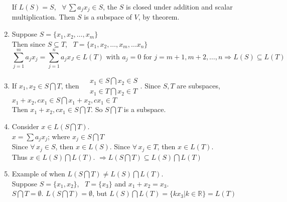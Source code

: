 \documentclass[twoside]{amsart}
\theoremstyle{plain}
\theoremstyle{definition}
\begin{document}
\begin{enumerate}
If $L(S) = S$, \, $\forall \, \sum a_j x_j \in S$, the $S$ is closed under addition and scalar multiplication.  Then $S$ is a subspace of $V$, by theorem.  
\item Suppose $S = \{ x_1, x_2, \dots, x_m \}$ \\
  Then since $S \subseteq T$, \, $T = \{ x_1, x_2, \dots, x_m, \dots x_n \}$ 
\[
\sum_{j=1}^m a_j x_j = \sum_{j=1}^n a_j x_J \in L(T) \text{ with } a_j = 0 \text{ for } j = m+1, m+2, \dots, n \Longrightarrow L(S) \subseteq L(T)
\]
\item If $x_1, x_2 \in S \bigcap T$, then $\begin{aligned}
  & x_1 \in S \bigcap x_2 \in S \\
  & x_1 \in T \bigcap x_2 \in T
\end{aligned}$.  Since $S,T$ are subspaces, $x_1 + x_2, cx_1 \in S \bigcap x_1 + x_2, cx_1 \in T$ \\
  Then $x_1 + x_2, c x_1 \in S \bigcap T$.  So $S \bigcap T$ is a subspace. 
\item Consider $x \in L(S \bigcap T)$.  \\
  $x = \sum a_j x_j$; where $x_j \in S \bigcap T$ \\
  Since $\forall \, x_j \in S$, then $x \in L(S)$.  Since $\forall \, x_j \in T$, then $x\in L(T)$.  \\
\quad Thus $x\in L(S) \bigcap L(T)$.  \quad $\Longrightarrow L(S\bigcap T) \subseteq L(S) \bigcap L(T)$
\item Example of when $L(S\bigcap T) \neq L(S) \bigcap L(T)$. \\
Suppose $S = \{ x_1, x_2 \}$, \, $T = \{ x_3 \}$ and $x_1 + x_2 = x_3$.  \\
$S \bigcap T = \emptyset$.  $L(S \bigcap T) = \emptyset$, but $L(S) \bigcap L(T) = \{ kx_3 | k \in \mathbb{R} \} = L(T)$
\end{enumerate}
\end{document}
